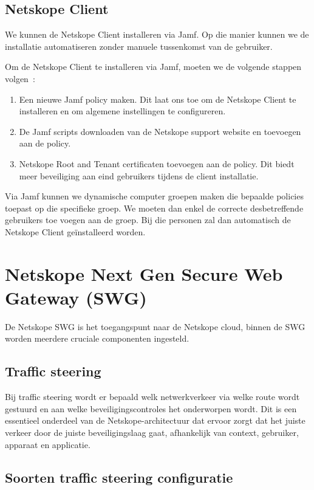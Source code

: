 \subsection{Netskope Client}
We kunnen de Netskope Client installeren via Jamf. Op die manier kunnen we de installatie automatiseren zonder manuele tussenkomst van de gebruiker.

Om de Netskope Client te installeren via Jamf, moeten we de volgende stappen volgen~\autocite{Netskope2025-9}:

\begin{enumerate}
    \item Een nieuwe Jamf policy maken. Dit laat ons toe om de Netskope Client te installeren en om algemene instellingen te configureren.
    \item De Jamf scripts downloaden van de Netskope support website en toevoegen aan de policy.
    \item Netskope Root and Tenant certificaten toevoegen aan de policy. Dit biedt meer beveiliging aan eind gebruikers tijdens de client installatie.
\end{enumerate}

Via Jamf kunnen we dynamische computer groepen maken die bepaalde policies toepast op die specifieke groep. We moeten dan enkel de correcte desbetreffende gebruikers toe voegen aan de groep. Bij die personen zal dan automatisch de Netskope Client geïnstalleerd worden.

\section{Netskope Next Gen Secure Web Gateway (SWG)}
De Netskope SWG is het toegangspunt naar de Netskope cloud, binnen de SWG worden meerdere cruciale componenten ingesteld.

\subsection{Traffic steering}
Bij traffic steering wordt er bepaald welk netwerkverkeer via welke route wordt gestuurd en aan welke beveiligingscontroles het onderworpen wordt. Dit is een essentieel onderdeel van de Netskope-architectuur dat ervoor zorgt dat het juiste verkeer door de juiste beveiligingslaag gaat, afhankelijk van context, gebruiker, apparaat en applicatie.

\subsection{Soorten traffic steering configuratie}

